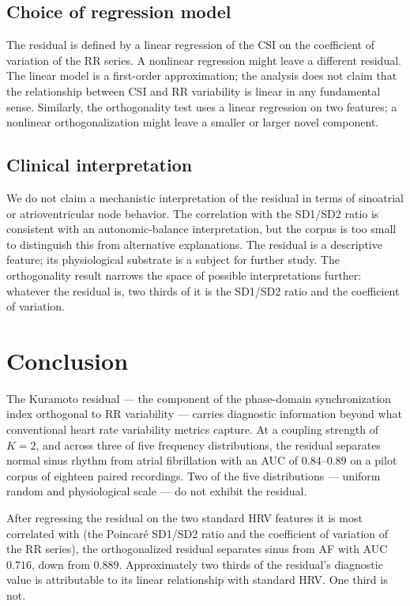 \documentclass[11pt]{article}
\begin{document}
\subsection{Choice of regression model}

The residual is defined by a linear regression of the CSI on the
coefficient of variation of the RR series. A nonlinear regression might
leave a different residual. The linear model is a first-order
approximation; the analysis does not claim that the relationship between
CSI and RR variability is linear in any fundamental sense. Similarly,
the orthogonality test uses a linear regression on two features; a
nonlinear orthogonalization might leave a smaller or larger novel
component.

\subsection{Clinical interpretation}

We do not claim a mechanistic interpretation of the residual in terms
of sinoatrial or atrioventricular node behavior. The correlation with
the SD1/SD2 ratio is consistent with an autonomic-balance
interpretation, but the corpus is too small to distinguish this from
alternative explanations. The residual is a descriptive feature; its
physiological substrate is a subject for further study. The
orthogonality result narrows the space of possible interpretations
further: whatever the residual is, two thirds of it is the SD1/SD2
ratio and the coefficient of variation.

\section{Conclusion}

The Kuramoto residual --- the component of the phase-domain
synchronization index orthogonal to RR variability --- carries
diagnostic information beyond what conventional heart rate variability
metrics capture. At a coupling strength of $K = 2$, and across three of
five frequency distributions, the residual separates normal sinus
rhythm from atrial fibrillation with an AUC of $0.84$--$0.89$ on a
pilot corpus of eighteen paired recordings. Two of the five
distributions --- uniform random and physiological scale --- do not
exhibit the residual.

After regressing the residual on the two standard HRV features it is
most correlated with (the Poincar\'e SD1/SD2 ratio and the coefficient
of variation of the RR series), the orthogonalized residual separates
sinus from AF with AUC $0.716$, down from $0.889$. Approximately two
thirds of the residual's diagnostic value is attributable to its linear
relationship with standard HRV. One third is not.
\end{document}
